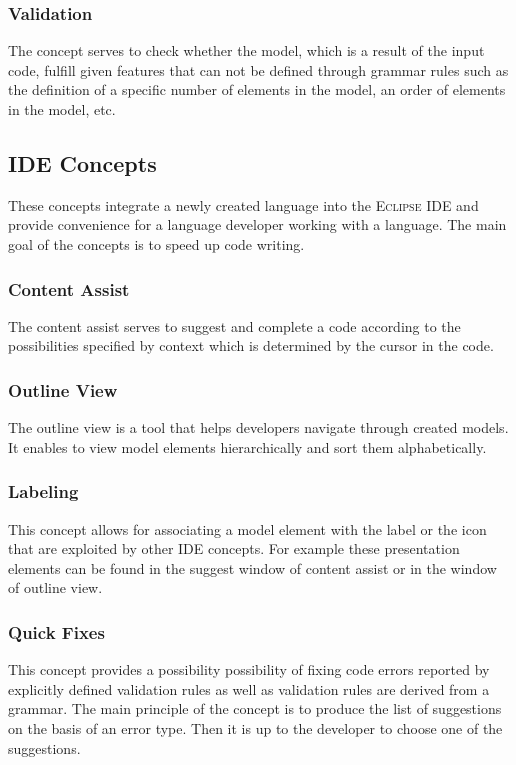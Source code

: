 \documentclass[12pt,notitlepage,a4paper]{report}
\begin{document}
\subsubsection{Validation}{The concept serves to check whether the model, which is a result of the input code, fulfill given features that  can not be defined through grammar rules such as the definition of a specific number of elements in the model, an order of elements in the model, etc.}

\subsection{IDE Concepts}

These concepts integrate a newly created language into the \textsc{Eclipse IDE} and provide convenience for a language developer working with a language. The main goal of the concepts is to speed up code writing.

\subsubsection{Content Assist}{The content assist serves to suggest and complete a code according to the possibilities specified by context which is determined by the cursor in the code.}

\subsubsection{Outline View}{The outline view is a tool that helps developers navigate through created models. It enables to view model elements hierarchically and sort them alphabetically.}

\subsubsection{Labeling}{This concept allows for associating a model element with the label or the icon that are exploited by other IDE concepts. For example these presentation elements can be found in the suggest window of content assist or in the window of outline view.}

\subsubsection{Quick Fixes}{This concept provides a possibility possibility of fixing code errors reported by explicitly defined validation rules as well as validation rules are derived from a grammar. The main principle of the concept is to produce the list of suggestions on the basis of an error type. Then it is up to the developer to choose one of the suggestions.}
\end{document}
